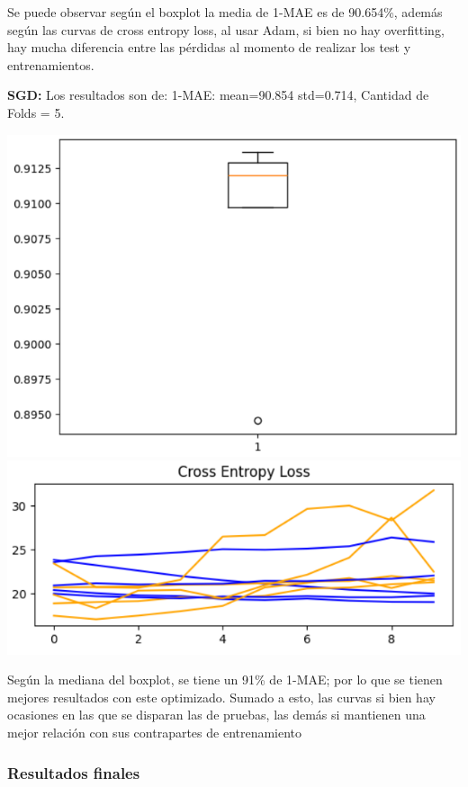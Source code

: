 Se puede observar según el boxplot la media de 1-MAE es de 90.654\%, además según las curvas de cross entropy loss, al usar Adam, si bien no hay overfitting, hay mucha diferencia entre las pérdidas al momento de realizar los test y entrenamientos.

\textbf{SGD: } Los resultados son de: 1-MAE: mean=90.854 std=0.714, Cantidad de Folds = 5.

\begin{center}
\includegraphics[scale=0.3]{Imagenes/image6.png}
\includegraphics[scale=0.3]{Imagenes/7gh.png}    
\end{center}

Según la mediana del boxplot, se tiene un 91\% de 1-MAE; por lo que se tienen mejores resultados con este optimizado. Sumado a esto, las curvas si bien hay ocasiones en las que se disparan las de pruebas, las demás si mantienen una mejor relación con sus contrapartes de entrenamiento
\subsubsection{Resultados finales}

